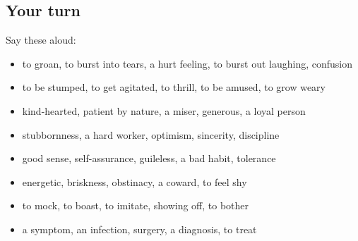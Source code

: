 \subsection*{Your turn}
Say these aloud:

\begin{itemize}
\raggedright
  \item to groan, to burst into tears, a hurt feeling, to burst out laughing, confusion
  \item to be stumped, to get agitated, to thrill, to be amused, to grow weary
  \item kind-hearted, patient by nature, a miser, generous, a loyal person
  \item stubbornness, a hard worker, optimism, sincerity, discipline
  \item good sense, self-assurance, guileless, a bad habit, tolerance
  \item energetic, briskness, obstinacy, a coward, to feel shy
  \item to mock, to boast, to imitate, showing off, to bother
  \item a symptom, an infection, surgery, a diagnosis, to treat
\end{itemize}

